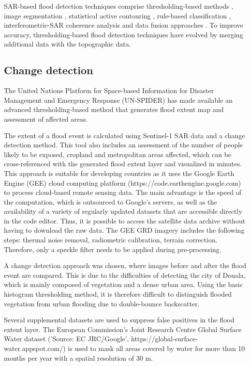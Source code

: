 SAR-based flood detection techniques comprise thresholding-based methods \cite{Inglada2007}, image segmentation \cite{martinis2009towards}, statistical active contouring \cite{horritt2001flood}, rule-based classification \cite{pradhan2016new}, interferometric-SAR coherence analysis and data fusion approaches \cite{d2016bayesian}. 
To improve accuracy, thresholding-based flood detection techniques have evolved by merging additional data with the topographic data.


\subsection{Change detection}
The United Nations Platform for Space-based Information for Disaster Management and Emergency Response (UN-SPIDER) has made available an advanced thresholding-based method that generates flood extent map and assessment of affected areas\cite{un-spider}. 

The extent of a flood event is calculated using Sentinel-1 SAR data and a change detection method. This tool also includes an assessment of the number of people likely to be exposed, cropland and metropolitan areas affected, which can be cross-referenced with the generated flood extent layer and visualized in minutes.
This approach is suitable for developing countries as it uses the Google Earth Engine (GEE) cloud computing platform (https://code.earthengine.google.com) to process cloud-based remote sensing data. The main advantage is the speed of the computation, which is outsourced to Google's servers, as well as the availability of a variety of regularly updated datasets that are accessible directly in the code editor. Thus, it is possible to access the satellite data archive without having to download the raw data. The GEE GRD imagery includes the following steps: thermal noise removal, radiometric calibration, terrain correction. Therefore, only a speckle filter needs to be applied during pre-processing. 

A change detection approach was chosen, where images before and after the flood event are compared. This is due to the difficulties of detecting the city of Douala, which is mainly composed of vegetation and a dense urban area.  Using the basic histogram thresholding method, it is therefore difficult to distinguish flooded vegetation from urban flooding due to double-bounce backscatter\cite{manavalan2018review}.

Several supplemental datasets are used to suppress false positives in the flood extent layer. The European Commission's Joint Research Centre Global Surface Water dataset ('Source: EC JRC/Google', https://global-surface-water.appspot.com/) is used to mask all areas covered by water for more than 10 months per year with a spatial resolution of 30 m\cite{pekel2016high}. 

